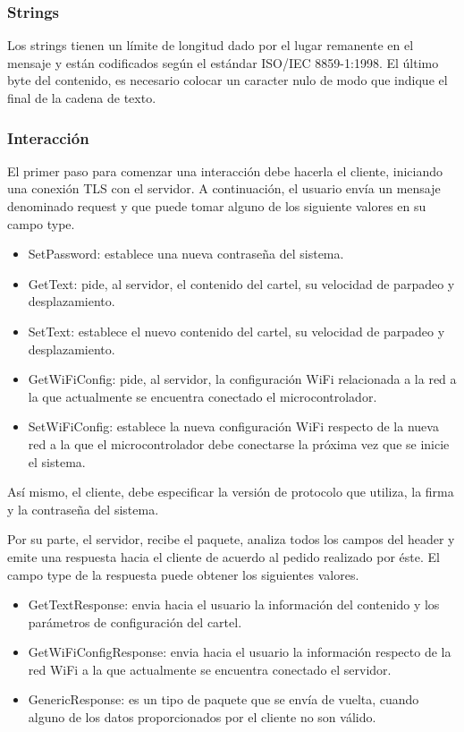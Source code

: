 \subsubsection{Strings}

Los strings tienen un límite de longitud dado por el lugar remanente en el mensaje y están codificados según el estándar ISO/IEC 8859-1:1998.
El último byte del contenido, es necesario colocar un caracter nulo de modo que indique el final de la cadena de texto.



\subsubsection{Interacción}

El primer paso para comenzar una interacción debe hacerla el cliente, iniciando una conexión TLS con el servidor.
A continuación, el usuario envía un mensaje denominado request y que puede tomar alguno de los siguiente valores en su campo type.

\begin{itemize}
	\item SetPassword: establece una nueva contraseña del sistema.
	\item GetText: pide, al servidor, el contenido del cartel, su velocidad de parpadeo y desplazamiento.
	\item SetText: establece el nuevo contenido del cartel, su velocidad de parpadeo y desplazamiento.
	\item GetWiFiConfig: pide, al servidor, la configuración WiFi relacionada a la red a la que actualmente se encuentra conectado el microcontrolador.
	\item SetWiFiConfig: establece la nueva configuración WiFi respecto de la nueva red a la que el microcontrolador debe conectarse la próxima vez que se inicie el sistema.
\end{itemize}

Así mismo, el cliente, debe especificar la versión de protocolo que utiliza, la firma y la contraseña del sistema.

Por su parte, el servidor, recibe el paquete, analiza todos los campos del header y emite una respuesta hacia el cliente de acuerdo al pedido realizado por éste.
El campo type de la respuesta puede obtener los siguientes valores.

\begin{itemize}
	\item GetTextResponse: envia hacia el usuario la información del contenido y los parámetros de configuración del cartel.
	\item GetWiFiConfigResponse: envia hacia el usuario la información respecto de la red WiFi a la que actualmente se encuentra conectado el servidor.
	\item GenericResponse: es un tipo de paquete que se envía de vuelta, cuando alguno de los datos proporcionados por el cliente no son válido.
\end{itemize}

